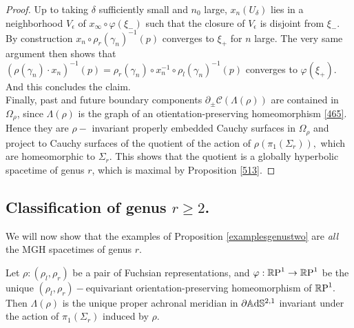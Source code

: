 \begin{proof}
    Up to taking $\delta$ sufficiently small and $n_0$ large, $x_n(U_\delta)$ lies in a neighborhood $V_\epsilon$ of $x_\infty\circ\varphi(\xi_-)$ such that the closure of $V_\epsilon$ is disjoint from $\xi_-$. By construction $x_n\circ \rho_r(\gamma_n)^{-1}(p)$ converges to $\xi_+$ for $n$ large. The very same argument then shows that $(\rho(\gamma_n)\cdot x_n)^{-1}(p)=\rho_r(\gamma_n)\circ x_n^{-1}\circ\rho_l(\gamma_n)^{-1}(p)$ converges to $\varphi(\xi_+)$. And this concludes the claim. \\
    Finally, past and future boundary components $\partial_\pm\mathcal{C}(\Lambda(\rho))$ are contained in $\Omega_{\rho}$, since $\Lambda(\rho)$ is the graph of an otientation-preserving homeomorphism \ref{465}. Hence they are $\rho-$ invariant properly embedded Cauchy surfaces in $\Omega_\rho$ and project to Cauchy surfaces of the quotient of the action of $\rho(\pi_1(\Sigma_r)),$ which are homeomorphic to $\Sigma_r$. This shows that the quotient is a globally hyperbolic spacetime of genus $r$, which is maximal by Proposition \ref{513}.
\end{proof}

\subsection{Classification of genus $r\geq 2$.} We will now show that the examples of Proposition \ref{examplesgenustwo} are \textit{all} the MGH spacetimes of genus $r$. 

\begin{lemma}
    Let $\rho:(\rho_l,\rho_r)$ be a pair of Fuchsian representations, and $\varphi:\mathbb{R}\text{P}^1\to\mathbb{R}\text{P}^1$ be the unique $(\rho_l,\rho_r)-$equivariant orientation-preserving homeomorphism of $\mathbb{R}\text{P}^1.$ Then $\Lambda(\rho)$ is the unique proper achronal meridian in $\partial\mathbb{A}\mathrm{d}\mathbb{S}^{2,1}$ invariant under the action of $\pi_1(\Sigma_r)$ induced by $\rho.$
\end{lemma}

